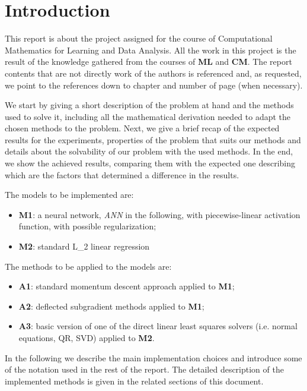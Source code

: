 \section{Introduction}
This report is about the project assigned for the course of Computational Mathematics for Learning and Data Analysis. All the work in this project is the result of the knowledge gathered from the courses of \textbf{ML} and \textbf{CM}. The report contents that are not directly work of the authors is referenced and, as requested, we point to the references down to chapter and number of page (when necessary).

We start by giving a short description of the problem at hand and the methods used to solve it, including all the mathematical derivation needed to adapt the chosen methods to the problem. Next, we give a brief recap of the expected results for the experiments, properties of the problem that suits our methods and details about the solvability of our problem with the used methods. In the end, we show the achieved results, comparing them with the expected one describing which are the factors that determined a difference in the results.

The models to be implemented are:
\begin{itemize}
    \item \textbf{M1}: a neural network, \textit{ANN} in the following, with piecewise-linear activation function, with possible regularization;
    \item \textbf{M2}: standard L\_2 linear regression
\end{itemize}
The methods to be applied to the models are:
\begin{itemize}
    \item \textbf{A1}: standard momentum descent approach applied to \textbf{M1};
    \item \textbf{A2}: deflected subgradient methods applied to \textbf{M1};
    \item \textbf{A3}: basic version of one of the direct linear least squares solvers (i.e. normal equations, QR, SVD) applied to \textbf{M2}.
\end{itemize}
In the following we describe the main implementation choices and introduce some of the notation used in the rest of the report. The detailed description of the implemented methods is given in the related sections of this document.